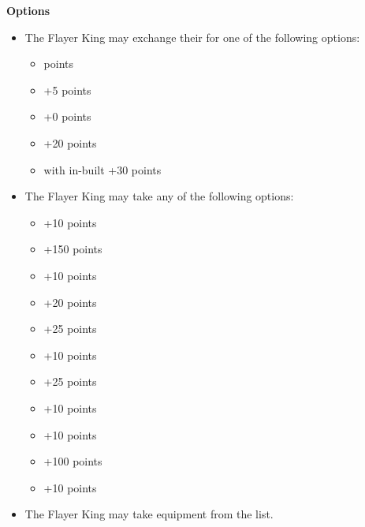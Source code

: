 \begin{minipage}[t]{0.72\textwidth}
	\vspace*{2em}
	\textbf{Options}
	\begin{itemize}
		\item The Flayer King may exchange their  for one of the following options:
		\begin{itemize}			
			\item {}  points
			\item {} \dotfill +5 points
			\item {} \dotfill +0 points
			\item {} \dotfill +20 points
			\item {} with in-built  \dotfill +30 points
		\end{itemize}
		\item The Flayer King may take any of the following options:
		\begin{itemize}
			\item {} \dotfill +10 points
			\item {} \dotfill +150 points
			\item {}\dotfill +10 points
			\item {} \dotfill +20 points
			\item {} \dotfill +25 points
			\item {} \dotfill +10 points
			\item {} \dotfill +25 points
			\item {} \dotfill +10 points
			\item {} \dotfill +10 points
			\item {} \dotfill +100 points
			\item {} \dotfill +10 points
		\end{itemize}
		\item The Flayer King may take equipment from the  list.
	\end{itemize}
\end{minipage}
\hspace{0.5em}


